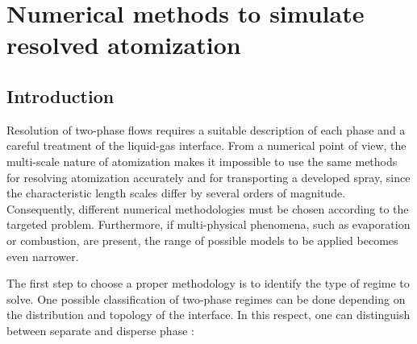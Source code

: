 \chapter{Numerical methods to simulate resolved atomization}
	\label{ch2:numerical_methods_resolved_atomization}

\section{Introduction}


Resolution of two-phase flows requires a suitable description of each phase and a careful treatment of the liquid-gas interface. From a numerical point of view, the multi-scale nature of atomization makes it impossible to use the same methods for resolving atomization accurately and for transporting a developed spray, since the characteristic length scales differ by several orders of magnitude. Consequently, different numerical methodologies must be chosen according to the targeted problem. Furthermore, if multi-physical phenomena, such as evaporation or combustion, are present, the range of possible models to be applied becomes even narrower.

The first step to choose a proper methodology is to identify the type of regime to solve. One possible classification of two-phase regimes can be done depending on the distribution and topology of the interface. In this respect, one can distinguish between separate and disperse phase : 




